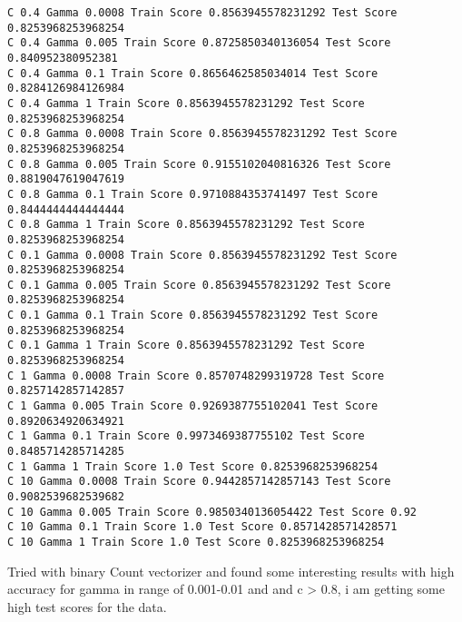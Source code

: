 \documentclass[11pt]{article}
\begin{document}
    \begin{Verbatim}[commandchars=\\\{\}]
C 0.4 Gamma 0.0008 Train Score 0.8563945578231292 Test Score 0.8253968253968254
C 0.4 Gamma 0.005 Train Score 0.8725850340136054 Test Score 0.840952380952381
C 0.4 Gamma 0.1 Train Score 0.8656462585034014 Test Score 0.8284126984126984
C 0.4 Gamma 1 Train Score 0.8563945578231292 Test Score 0.8253968253968254
C 0.8 Gamma 0.0008 Train Score 0.8563945578231292 Test Score 0.8253968253968254
C 0.8 Gamma 0.005 Train Score 0.9155102040816326 Test Score 0.8819047619047619
C 0.8 Gamma 0.1 Train Score 0.9710884353741497 Test Score 0.8444444444444444
C 0.8 Gamma 1 Train Score 0.8563945578231292 Test Score 0.8253968253968254
C 0.1 Gamma 0.0008 Train Score 0.8563945578231292 Test Score 0.8253968253968254
C 0.1 Gamma 0.005 Train Score 0.8563945578231292 Test Score 0.8253968253968254
C 0.1 Gamma 0.1 Train Score 0.8563945578231292 Test Score 0.8253968253968254
C 0.1 Gamma 1 Train Score 0.8563945578231292 Test Score 0.8253968253968254
C 1 Gamma 0.0008 Train Score 0.8570748299319728 Test Score 0.8257142857142857
C 1 Gamma 0.005 Train Score 0.9269387755102041 Test Score 0.8920634920634921
C 1 Gamma 0.1 Train Score 0.9973469387755102 Test Score 0.8485714285714285
C 1 Gamma 1 Train Score 1.0 Test Score 0.8253968253968254
C 10 Gamma 0.0008 Train Score 0.9442857142857143 Test Score 0.9082539682539682
C 10 Gamma 0.005 Train Score 0.9850340136054422 Test Score 0.92
C 10 Gamma 0.1 Train Score 1.0 Test Score 0.8571428571428571
C 10 Gamma 1 Train Score 1.0 Test Score 0.8253968253968254

    \end{Verbatim}

    Tried with binary Count vectorizer and found some interesting results
with high accuracy for gamma in range of 0.001-0.01 and and c
\textgreater{} 0.8, i am getting some high test scores for the data.
\end{document}
